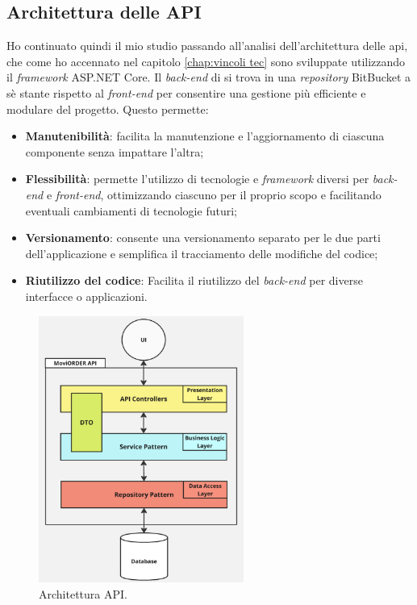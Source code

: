 \subsection{Architettura delle API}
Ho continuato quindi il mio studio passando all'analisi dell'architettura delle \gls{api}, che come ho accennato nel capitolo 
\ref{chap:vincoli tec} sono sviluppate utilizzando il \textit{framework} ASP.NET Core. 
Il \textit{back-end} di {\movi} si trova in una \textit{repository} BitBucket a sè stante rispetto al \textit{front-end} per consentire 
una gestione più efficiente e modulare del progetto. Questo permette: 
\begin{itemize}
    \item \textbf{Manutenibilità}: facilita la manutenzione e l'aggiornamento di ciascuna componente senza impattare l'altra;
    \item \textbf{Flessibilità}: permette l'utilizzo di tecnologie e \textit{framework} diversi per \textit{back-end} e 
          \textit{front-end}, ottimizzando ciascuno per il proprio scopo e facilitando eventuali cambiamenti di tecnologie futuri;
    \item \textbf{Versionamento}: consente una versionamento separato per le due parti dell'applicazione e semplifica il 
          tracciamento delle modifiche del codice;
    \item \textbf{Riutilizzo del codice}: Facilita il riutilizzo del \textit{back-end} per diverse interfacce o applicazioni.
\end{itemize}

\begin{figure}[H]
    \centering
    \includegraphics[width=0.6\textwidth]{img/repository-service.png}
    \caption{Architettura API.}
    \label{fig:repository-service}
\end{figure}

